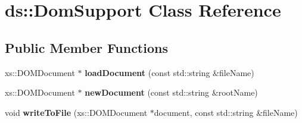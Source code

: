 \hypertarget{classds_1_1DomSupport}{}\section{ds\+:\+:Dom\+Support Class Reference}
\label{classds_1_1DomSupport}
\subsection*{Public Member Functions}
\begin{DoxyCompactItemize}
\item 
\hypertarget{classds_1_1DomSupport_a91e0e9a70a874726d2f6927a1b1d8a4c}{}xs\+::\+D\+O\+M\+Document $\ast$ {\bfseries load\+Document} (const std\+::string \&file\+Name)\label{classds_1_1DomSupport_a91e0e9a70a874726d2f6927a1b1d8a4c}

\item 
\hypertarget{classds_1_1DomSupport_a769303e866100ab0e520eb6137f42ed4}{}xs\+::\+D\+O\+M\+Document $\ast$ {\bfseries new\+Document} (const std\+::string \&root\+Name)\label{classds_1_1DomSupport_a769303e866100ab0e520eb6137f42ed4}

\item 
\hypertarget{classds_1_1DomSupport_a66da58f68c7b44d809b0047f5c51905c}{}void {\bfseries write\+To\+File} (xs\+::\+D\+O\+M\+Document $\ast$document, const std\+::string \&file\+Name)\label{classds_1_1DomSupport_a66da58f68c7b44d809b0047f5c51905c}

\end{DoxyCompactItemize}
